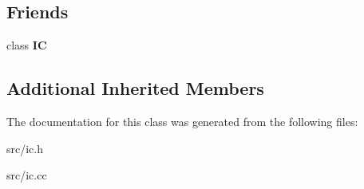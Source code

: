 \subsection*{Friends}
\begin{DoxyCompactItemize}
\item 
\hypertarget{classv8_1_1internal_1_1_load_i_c_ae59e849648858af1fd22081890d47b78}{}class {\bfseries I\+C}\label{classv8_1_1internal_1_1_load_i_c_ae59e849648858af1fd22081890d47b78}

\end{DoxyCompactItemize}
\subsection*{Additional Inherited Members}


The documentation for this class was generated from the following files\+:\begin{DoxyCompactItemize}
\item 
src/ic.\+h\item 
src/ic.\+cc\end{DoxyCompactItemize}
